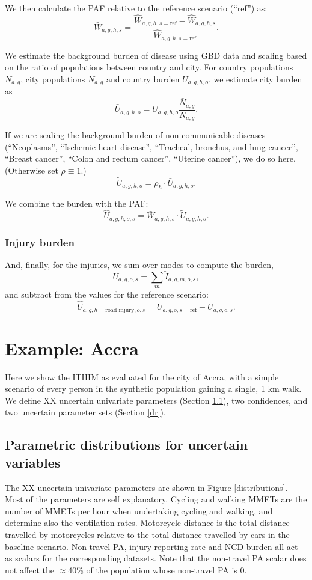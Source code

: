 \documentclass{article}
\begin{document}
We then calculate the PAF relative to the reference scenario (``ref'') as:
$$\bar{W}_{a,g,h,s}= \frac{\hat{W}_{a,g,h,s=\text{ref}}-\hat{W}_{a,g,h,s}}{\hat{W}_{a,g,h,s=\text{ref}}}.$$

We estimate the background burden of disease using GBD data and scaling based on the ratio of populations between country and city. For country populations $N_{a,g}$, city populations $\bar{N}_{a,g}$ and country burden $U_{a,g,h,o}$, we estimate city burden as
$$\bar{U}_{a,g,h,o}=U_{a,g,h,o}\frac{\bar{N}_{a,g}}{N_{a,g}}.$$

If we are scaling the background burden of non-communicable diseases (``Neoplasms'', ``Ischemic heart disease'', ``Tracheal, bronchus, and lung cancer'', ``Breast cancer'', ``Colon and rectum cancer'', ``Uterine cancer''), we do so here. (Otherwise set $\rho\equiv 1$.)
$$\tilde{U}_{a,g,h,o}=\rho_h\cdot  \bar{U}_{a,g,h,o}.$$

We combine the burden with the PAF:
$$\hat{U}_{a,g,h,o,s}=\bar{W}_{a,g,h,s}\cdot\tilde{U}_{a,g,h,o}.$$

\subsubsection{Injury burden}

And, finally, for the injuries, we sum over modes to compute the burden,
$$\bar{U}_{a,g,o,s}=\sum_m\check{I}_{a,g,m,o,s},$$
and subtract from the values for the reference scenario:
$$\hat{U}_{a,g,h=\text{road injury},o,s}=\bar{U}_{a,g,o,s=\text{ref}}-\bar{U}_{a,g,o,s}.$$





\section{Example: Accra}\label{example}

Here we show the ITHIM as evaluated for the city of Accra, with a simple scenario of every person in the synthetic population gaining a single, 1 km walk. We define XX uncertain univariate parameters (Section \ref{uni}), two confidences, and two uncertain parameter sets (Section \ref{dr}). 

\subsection{Parametric distributions for uncertain variables}\label{uni}

The XX uncertain univariate parameters are shown in Figure \ref{distributions}. Most of the parameters are self explanatory. Cycling and walking MMETs are the number of MMETs per hour when undertaking cycling and walking, and determine also the ventilation rates. Motorcycle distance is the total distance travelled by motorcycles relative to the total distance travelled by cars in the baseline scenario.  Non-travel PA, injury reporting rate and NCD burden all act as scalars for the corresponding datasets. Note that the non-travel PA scalar does not affect the $\approx$40\% of the population whose non-travel PA is 0. 
\end{document}
